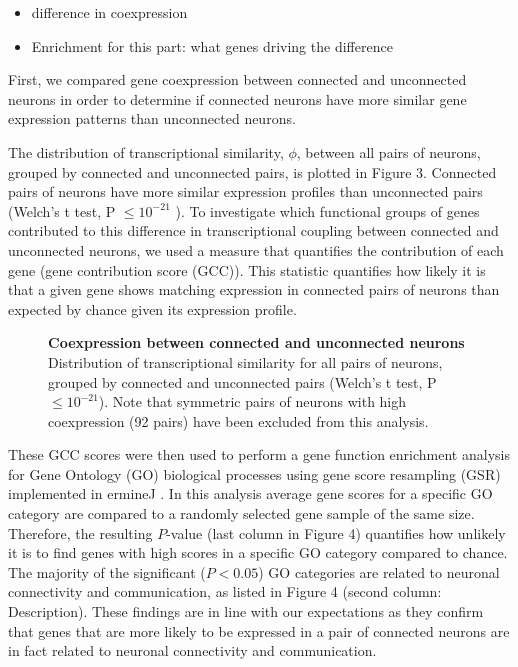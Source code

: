 \documentclass[10pt,letterpaper]{article}
\begin{document}
\begin{itemize}
    \item{difference in coexpression}
    \item{Enrichment for this part: what genes driving the difference}
\end{itemize} 
First, we compared gene coexpression between connected and unconnected neurons in order to determine if connected neurons have more similar gene expression patterns than unconnected neurons.

The distribution of transcriptional similarity, $\phi$, between all pairs of neurons, grouped by connected and unconnected pairs, is plotted in Figure 3.
Connected pairs of neurons have more similar expression profiles than unconnected pairs (Welch's t test, P $ \leq 10^{-21}$ ). To investigate which functional groups of genes contributed to this difference in transcriptional coupling between connected and unconnected neurons, we used a measure that quantifies the contribution of each gene (gene contribution score (GCC)).
This statistic quantifies how likely it is that a given gene shows matching expression in connected pairs of neurons than expected by chance given its expression profile.

 \begin{figure}[!h]
 \caption{{\bf Coexpression between connected and unconnected neurons}
Distribution of transcriptional similarity for all pairs of neurons, grouped by connected and unconnected pairs (Welch’s t test, P $ \leq 10^{-21}$). Note that symmetric pairs of neurons with high coexpression (92 pairs) have been excluded from this analysis.}
 \label{ConUnconChemical}
 \end{figure}

These GCC scores were then used to perform a gene function enrichment analysis for Gene Ontology (GO) biological processes using gene score resampling (GSR) implemented in ermineJ \cite{Gillis2010}.
In this analysis average gene scores for a specific GO category are compared to a randomly selected gene sample of the same size.
Therefore, the resulting $P$-value (last column in Figure 4) quantifies how unlikely it is to find genes with high scores in a specific GO category compared to chance.
The majority of the significant ($P < 0.05$) GO categories are related to neuronal connectivity and communication, as listed in Figure 4 (second column: Description).
These findings are in line with our expectations as they confirm that genes that are more likely to be expressed in a pair of connected neurons are in fact related to neuronal connectivity and communication.
\end{document}
